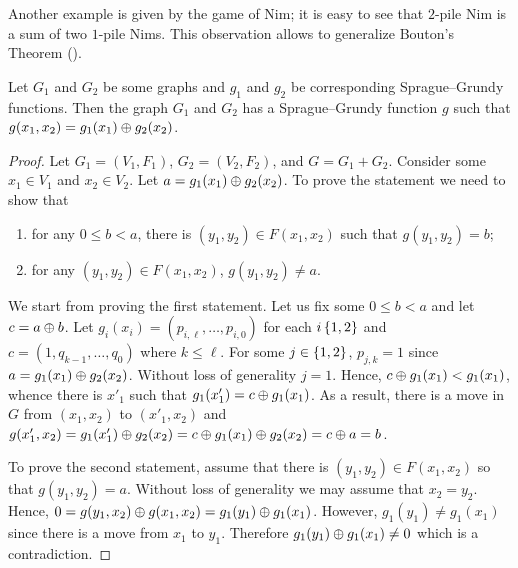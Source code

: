 Another example is given by the game of Nim; it is easy to see that
$2$-pile Nim is a sum of two $1$-pile Nims. This observation allows to generalize
Bouton's Theorem ().
\begin{theorem}
    Let $G_1$ and $G_2$ be some graphs and $g_1$ and $g_2$ be corresponding
    Sprague--Grundy functions. Then the graph $G_1$ and $G_2$ has a
    Sprague--Grundy function $g$ such that
    $g(x_1, x_2) = g_1(x_1) \oplus g_2(x_2)$.
\end{theorem}
\begin{proof}
    Let $G_1 = (V_1, F_1)$, $G_2 = (V_2, F_2)$, and $G = G_1 + G_2$.
    Consider some $x_1 \in V_1$ and $x_2 \in V_2$.
    Let $a = g_1(x_1) \oplus g_2(x_2)$. To prove the statement we need to
    show that
    \begin{enumerate}
        \item for any $0 \le b < a$, there is $(y_1, y_2) \in F(x_1, x_2)$ such
            that $g(y_1, y_2) = b$;
        \item for any $(y_1, y_2) \in F(x_1, x_2)$, $g(y_1, y_2) \neq a$.
    \end{enumerate}

    We start from proving the first statement.
    Let us fix some $0 \le b < a$ and let $c = a \oplus b$.
    Let $g_i(x_i) = (p_{i, \ell}, \dots, p_{i, 0})$ for each $i \set{1, 2}$ and
    $c = (1, q_{k - 1}, \dots, q_0)$ where $k \le \ell$.
    For some $j \in \set{1, 2}$, $p_{j, k} = 1$ since
    $a = g_1(x_1) \oplus g_2(x_2)$. Without loss of generality $j = 1$.
    Hence, $c \oplus g_1(x_1) < g_1(x_1)$, whence there is $x'_1$ such
    that $g_1(x'_1) = c \oplus g_1(x_1)$. As a result, there is a move in
    $G$ from $(x_1, x_2)$ to $(x'_1, x_2)$ and
    $g(x'_1, x_2) = g_1(x'_1) \oplus g_2(x_2) =
        c \oplus g_1(x_1) \oplus g_2(x_2) =
        c \oplus a = b$.

    To prove the second statement, assume that there is
    $(y_1, y_2) \in F(x_1, x_2)$ so that $g(y_1, y_2) = a$. Without loss of
    generality we may assume that $x_2 = y_2$. Hence,
    $0 = g(y_1, x_2) \oplus g(x_1, x_2) = g_1(y_1) \oplus g_1(x_1)$.
    However, $g_1(y_1) \neq g_1(x_1)$ since there is a move from $x_1$ to $y_1$.
    Therefore $g_1(y_1) \oplus g_1(x_1) \neq 0$ which is a contradiction.
\end{proof}
